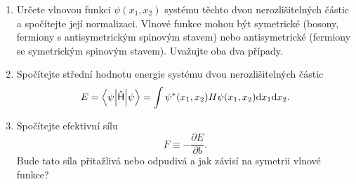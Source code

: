         \begin{enumerate}
            \item 
                Určete vlnovou funkci $\psi(x_{1},x_{2})$ systému těchto dvou nerozlišitelných částic a spočítejte její normalizaci.
                Vlnové funkce mohou být symetrické (bosony, fermiony s antisymetrickým spinovým stavem) nebo antisymetrické (fermiony se symetrickým spinovým stavem). 
                Uvažujte oba dva případy.
            
            \item Spočítejte střední hodnotu energie systému dvou nerozlišitelných částic
                \begin{equation}
                    E=\left\langle{\psi}\middle|{\mathsf{\hat{H}}}\middle|{\psi}\right\rangle=\int\psi^{*}(x_{1},x_{2})H\psi(x_{1},x_{2})\mathrm{d} x_{1}\mathrm{d} x_{2}.
                \end{equation}

            \item Spočítejte efektivní sílu
                \begin{equation}
                    F\equiv-\frac{\partial E}{\partial b}.
                \end{equation}
                Bude tato síla přitažlivá nebo odpudivá a jak závisí na symetrii vlnové funkce?
        \end{enumerate}
